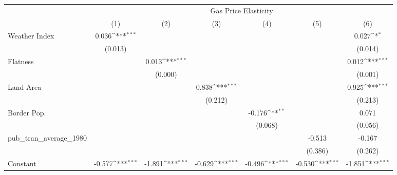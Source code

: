 {
\def\sym#1{\ifmmode^{#1}\else\(^{#1}\)\fi}
\begin{tabular}{l*{6}{c}}
\hline\hline
            &\multicolumn{6}{c}{Gas Price Elasticity}                                                                                           \\
            &\multicolumn{1}{c}{(1)}         &\multicolumn{1}{c}{(2)}         &\multicolumn{1}{c}{(3)}         &\multicolumn{1}{c}{(4)}         &\multicolumn{1}{c}{(5)}         &\multicolumn{1}{c}{(6)}         \\
\hline
Weather Index&       0.036\sym{***}&                     &                     &                     &                     &       0.027\sym{*}  \\
            &     (0.013)         &                     &                     &                     &                     &     (0.014)         \\
[1em]
Flatness    &                     &       0.013\sym{***}&                     &                     &                     &       0.012\sym{***}\\
            &                     &     (0.000)         &                     &                     &                     &     (0.001)         \\
[1em]
Land Area   &                     &                     &       0.838\sym{***}&                     &                     &       0.925\sym{***}\\
            &                     &                     &     (0.212)         &                     &                     &     (0.213)         \\
[1em]
Border Pop. &                     &                     &                     &      -0.176\sym{**} &                     &       0.071         \\
            &                     &                     &                     &     (0.068)         &                     &     (0.056)         \\
[1em]
pub\_tran\_average\_1980&                     &                     &                     &                     &      -0.513         &      -0.167         \\
            &                     &                     &                     &                     &     (0.386)         &     (0.262)         \\
[1em]
Constant    &      -0.577\sym{***}&      -1.891\sym{***}&      -0.629\sym{***}&      -0.496\sym{***}&      -0.530\sym{***}&      -1.851\sym{***}\\

\end{tabular}}
